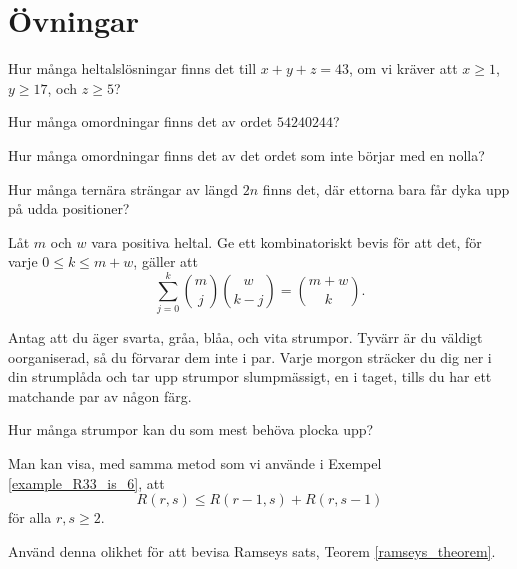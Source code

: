 \documentclass[nobib]{tufte-handout}
\begin{document}
\newpage

\section{Övningar}

\begin{xca}
  Hur många heltalslösningar finns det till $x + y + z = 43$, om vi kräver att $x \geq 1$, $y \geq 17$, och $z \geq 5$?
\end{xca}

\begin{xca}
  Hur många omordningar finns det av ordet $54240244$?

  Hur många omordningar finns det av det ordet som inte börjar med en nolla?
\end{xca}

\begin{xca}
  Hur många ternära strängar av längd $2n$ finns det, där ettorna bara får dyka upp på udda positioner?
\end{xca}

\begin{xca}
  Låt $m$ och $w$ vara positiva heltal. Ge ett kombinatoriskt bevis för att det, för varje $0 \leq k \leq m + w$, gäller att
  $$\sum_{j=0}^k \binom{m}{j}\binom{w}{k-j} = \binom{m + w}{k}.$$
\end{xca}

\begin{xca}
  Antag att du äger svarta, gråa, blåa, och vita strumpor. Tyvärr är du väldigt oorganiserad, så du förvarar dem inte i par. Varje morgon sträcker du dig ner i din strumplåda och tar upp strumpor slumpmässigt, en i taget, tills du har ett matchande par av någon färg.

  Hur många strumpor kan du som mest behöva plocka upp?
\end{xca}

\begin{xca}
  Man kan visa, med samma metod som vi använde i Exempel \ref{example_R33_is_6}, att
  $$R(r,s) \leq R(r-1,s) + R(r, s-1)$$
  för alla $r, s \geq 2$.

  Använd denna olikhet för att bevisa Ramseys sats, Teorem \ref{ramseys_theorem}.
\end{xca}

%
%
\end{document}
